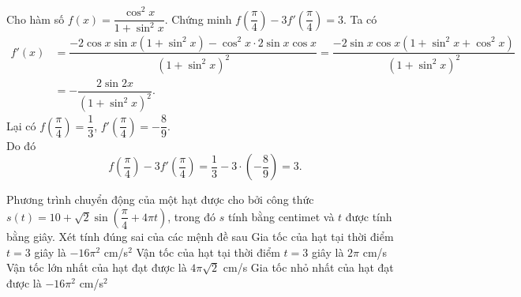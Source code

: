 \begin{bt}%
Cho hàm số $f(x)=\dfrac{\cos^2 x}{1+\sin^2 x}$. Chứng minh $f\left(\dfrac{\pi}{4}\right)-3f'\left(\dfrac{\pi}{4}\right)=3$.
	\loigiai
	{
		Ta có
		\begin{align*}
		f'(x) &=\dfrac{-2\cos x\sin x\left(1+\sin^2 x\right)-\cos^2 x\cdot 2\sin x\cos x}{\left(1+\sin^2 x\right)^2} = \dfrac{-2\sin x\cos x\left(1+\sin^2 x+\cos^2 x\right)}{\left(1+\sin^2 x\right)^2}\\
		&=-\dfrac{2\sin 2x}{\left(1+\sin^2 x\right)^2}.
		\end{align*}
		Lại có $f\left(\dfrac{\pi}{4}\right)=\dfrac{1}{3}$, $f'\left(\dfrac{\pi}{4}\right)=-\dfrac{8}{9}$.\\
		Do đó
		\[f\left(\dfrac{\pi}{4}\right)-3f'\left(\dfrac{\pi}{4}\right) = \dfrac{1}{3}-3\cdot \left(-\dfrac{8}{9}\right) = 3.\]
	}
\end{bt}

\begin{ex}%
 Phương trình chuyển động của một hạt được cho bởi công thức $s(t)=10+\sqrt{2}\sin\left(\dfrac{\pi}{4}+4\pi t\right)$, trong đó  $s$ tính bằng centimet và $t$ được tính bằng giây. Xét tính đúng sai của các mệnh đề sau
  \choiceTF
  {Gia tốc của hạt tại  thời điểm $t=3$ giây là $-16\pi^2$ cm/s$^2$}
  {\True Vận tốc của hạt tại  thời điểm $t=3$ giây là $2\pi$ cm/s}
  {\True Vận tốc lớn nhất của hạt đạt được  là $4\pi\sqrt{2}$ cm/s}
  {Gia tốc nhỏ nhất của hạt đạt được là $-16\pi^2$  cm/s$^2$}
\end{ex}

